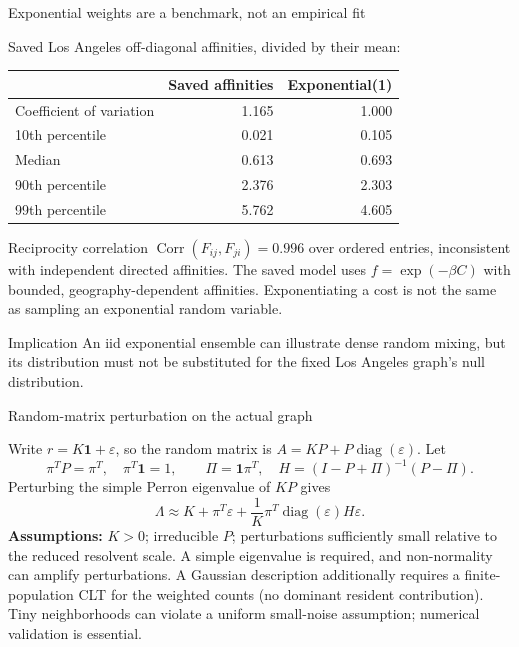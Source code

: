 \documentclass[aspectratio=169,10pt]{beamer}
\begin{document}
\begin{frame}{Exponential weights are a benchmark, not an empirical fit}
\small

Saved Los Angeles off-diagonal affinities, divided by their mean:
\begin{center}\begin{tabular}{lrr}
 & Saved affinities & Exponential(1)\\\hline
Coefficient of variation & 1.165 & 1.000\\
10th percentile & 0.021 & 0.105\\
Median & 0.613 & 0.693\\
90th percentile & 2.376 & 2.303\\
99th percentile & 5.762 & 4.605\\
\end{tabular}\end{center}
\medskip
Reciprocity correlation $\operatorname{Corr}(F_{ij},F_{ji})=0.996$ over ordered entries, inconsistent with independent directed affinities.
\medskip
The saved model uses $f=\exp(-\beta C)$ with bounded, geography-dependent affinities. Exponentiating a cost is not the same as sampling an exponential random variable.
\begin{block}{Implication}
An iid exponential ensemble can illustrate dense random mixing, but its distribution must not be substituted for the fixed Los Angeles graph's null distribution.
\end{block}

\end{frame}

\begin{frame}{Random-matrix perturbation on the actual graph}
\small

Write $r=K\mathbf1+\varepsilon$, so the random matrix is
$A=KP+P\operatorname{diag}(\varepsilon)$. Let
\[
 \pi^TP=\pi^T,\quad\pi^T\mathbf1=1,\qquad
 \Pi=\mathbf1\pi^T,\quad
 H=(I-P+\Pi)^{-1}(P-\Pi).
\]
Perturbing the simple Perron eigenvalue of $KP$ gives
\[
 \boxed{\Lambda\approx K+\pi^T\varepsilon+
 \frac1K\pi^T\operatorname{diag}(\varepsilon)H\varepsilon.}
\]
\textbf{Assumptions:} $K>0$; irreducible $P$; perturbations sufficiently small relative to the reduced resolvent scale. A simple eigenvalue is required, and non-normality can amplify perturbations.
\medskip
A Gaussian description additionally requires a finite-population CLT for the weighted counts (no dominant resident contribution). Tiny neighborhoods can violate a uniform small-noise assumption; numerical validation is essential.

\end{frame}
\end{document}
